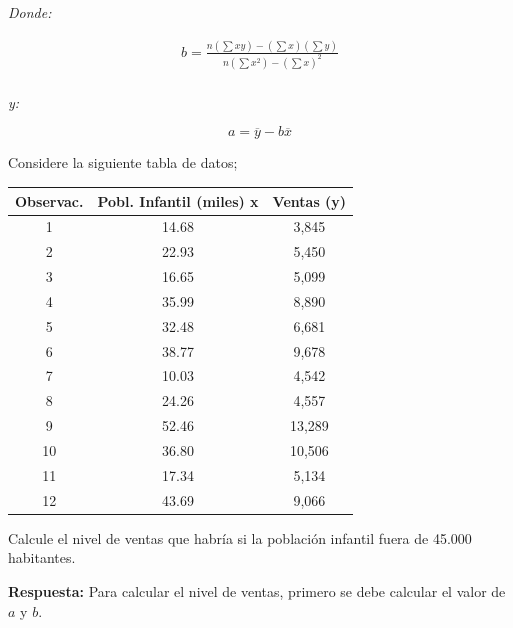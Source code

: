 \documentclass{templateNote}
\begin{document}
\textit{Donde:}

\begin{align*}
    b = \frac{n(\sum xy) - (\sum x)(\sum y)}{n(\sum x^2) - (\sum x)^2} \\
\end{align*}

\textit{y:}

\begin{equation*}
    a = \overline{y} - b\overline{x}
\end{equation*}

\begin{tcolorbox}[colback=red!5!white,colframe=blue!75!black]
    Considere la siguiente tabla de datos;

    \begin{table}[H]
        \centering
        \begin{tabular}{|c|c|c|}
            \hline
            Observac. & Pobl. Infantil (miles) x & Ventas (y) \\\hline
            1 & 14.68 & 3,845 \\\hline
            2 & 22.93 & 5,450 \\\hline
            3 & 16.65 & 5,099 \\\hline
            4 & 35.99 & 8,890 \\\hline
            5 & 32.48 & 6,681 \\\hline
            6 & 38.77 & 9,678 \\\hline
            7 & 10.03 & 4,542 \\\hline
            8 & 24.26 & 4,557 \\\hline
            9 & 52.46 & 13,289 \\\hline
            10 & 36.80 & 10,506 \\\hline
            11 & 17.34 & 5,134 \\\hline
            12 & 43.69 & 9,066 \\\hline
        \end{tabular}
    \end{table}

    Calcule el nivel de ventas que habría si la población infantil fuera de 45.000 habitantes.

    \textbf{Respuesta:} Para calcular el nivel de ventas, primero se debe calcular el valor de $a$ y $b$.


\end{tcolorbox}
\end{document}
